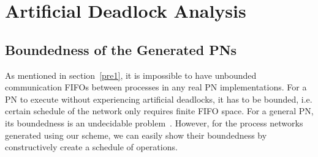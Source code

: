 \documentclass{sig-alternate}
\begin{document}

\section{Artificial Deadlock Analysis}
\label{deadlock}
\subsection{Boundedness of the Generated PNs}
As mentioned in section~\ref{pre1}, it is impossible to have unbounded communication FIFOs between processes in any real PN implementations. For a PN to execute without experiencing artificial deadlocks, it has to be bounded, i.e. certain schedule of the network only requires finite FIFO space.
For a general PN, its boundedness is an undecidable problem~\cite{parks1995bounded}. However, for the process networks generated using our scheme, 
we can easily show their boundedness by constructively create a schedule of operations.
\end{document}
